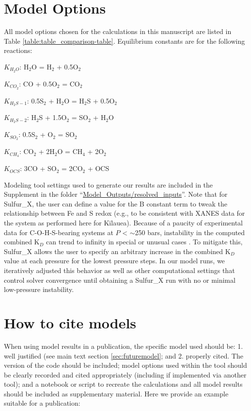 \documentclass[draft, english]{volcanica-template}
\begin{document}
\section{Model Options}
All model options chosen for the calculations in this manuscript are listed in Table \ref{table:table_comparison-table}. Equilibrium constants are for the following reactions:

$K_{H_2O}$: H$_2$O = H$_2$ + 0.5O$_2$

$K_{CO_2}$: CO + 0.5O$_2$ = CO$_2$

$K_{H_2S-1}$: 0.5S$_2$ + H$_2$O = H$_2$S + 0.5O$_2$

$K_{H_2S-2}$: H$_2$S + 1.5O$_2$ = SO$_2$ + H$_2$O

$K_{SO_2}$: 0.5S$_2$ + O$_2$ = SO$_2$

$K_{CH_4}$: CO$_2$ + 2H$_2$O = CH$_4$ + 2O$_2$

$K_{OCS}$: 3CO + SO$_2$ = 2CO$_2$ + OCS

\noindent Modeling tool settings used to generate our results are included in the Supplement in the folder ``\url{Model\_Outputs/resolved\_inputs}''. Note that for Sulfur\_X, the user can define a value for the B constant term to tweak the relationship between Fe and S redox (e.g., to be consistent with XANES data for the system as performed here for Kīlauea). Because of a paucity of experimental data for C-O-H-S-bearing systems at $P$ < $\sim$250 bars, instability in the computed combined K$_D$ can trend to infinity in special or unusual cases \parencite{Ding2023}. To mitigate this, Sulfur\_X allows the user to specify an arbitrary increase in the combined K$_D$ value at each pressure for the lowest pressure steps. In our model runs, we iteratively adjusted this behavior as well as other computational settings that control solver convergence until obtaining a Sulfur\_X run with no or minimal low-pressure instability. 

\label{supp-table_comparison-table}

\section{How to cite models}
When using model results in a publication, the specific model used should be: 1. well justified (see main text section \ref{sec:futuremodel}; and 2. properly cited. The version of the code should be included; model options used within the tool should be clearly recorded and cited appropriately (including if implemented via another tool); and a notebook or script to recreate the calculations and all model results should be included as supplementary material. Here we provide an example suitable for a publication:
\end{document}

